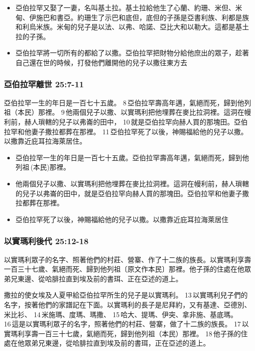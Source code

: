 \begin{itemize} 
\itemsep-.35em 
\item 亞伯拉罕又娶了一妻，名叫基土拉。基土拉給他生了心蘭、約珊、米但、米甸、伊施巴和書亞。約珊生了示巴和底但，底但的子孫是亞書利族、利都是族和利烏米族。米甸的兒子是以法、以弗、哈諾、亞比大和以勒大。這都是基土拉的子孫。
\item 亞伯拉罕將一切所有的都給了以撒。亞伯拉罕把財物分給他庶出的眾子，趁著自己還在世的時候，打發他們離開他的兒子以撒往東方去
\end{itemize} 

\subsubsection{亞伯拉罕離世 25:7-11}
亞伯拉罕一生的年日是一百七十五歲。 8 亞伯拉罕壽高年邁，氣絕而死，歸到他列祖（本民）那裡。 9 他兩個兒子以撒、以實瑪利把他埋葬在麥比拉洞裡。這洞在幔利前，赫人瑣轄的兒子以弗崙的田中， 10 就是亞伯拉罕向赫人買的那塊田。亞伯拉罕和他妻子撒拉都葬在那裡。 11 亞伯拉罕死了以後，神賜福給他的兒子以撒。以撒靠近庇耳拉海萊居住。

\begin{itemize} 
\itemsep-.35em 
\item 亞伯拉罕一生的年日是一百七十五歲。亞伯拉罕壽高年邁，氣絕而死，歸到他列祖 (本民)那裡。
\item 他兩個兒子以撒、以實瑪利把他埋葬在麥比拉洞裡。這洞在幔利前，赫人瑣轄的兒子以弗崙的田中，就是亞伯拉罕向赫人買的那塊田。亞伯拉罕和他妻子撒拉都葬在那裡。
\item 亞伯拉罕死了以後，神賜福給他的兒子以撒。以撒靠近庇耳拉海萊居住
\end{itemize} 

\subsubsection{以實瑪利後代 25:12-18 }
\label{sec:YiShiMaLiHouDai}
\noindent
以實瑪利眾子的名字、照著他們的村莊、營寨、作了十二族的族長。以實瑪利享壽一百三十七歲、氣絕而死、歸到他列祖〔原文作本民〕那裡。他子孫的住處在他眾弟兄東邊、從哈腓拉直到埃及前的書珥、正在亞述的道上。

撒拉的使女埃及人夏甲給亞伯拉罕所生的兒子是以實瑪利。 13 以實瑪利兒子們的名字，按著他們的家譜記在下面。以實瑪利的長子是尼拜約，又有基達、亞德別、米比衫、 14 米施瑪、度瑪、瑪撒、 15 哈大、提瑪、伊突、拿非施、基底瑪。 16 這是以實瑪利眾子的名字，照著他們的村莊、營寨，做了十二族的族長。 17 以實瑪利享壽一百三十七歲，氣絕而死，歸到他列祖（本民）那裡。 18 他子孫的住處在他眾弟兄東邊，從哈腓拉直到埃及前的書珥，正在亞述的道上。

